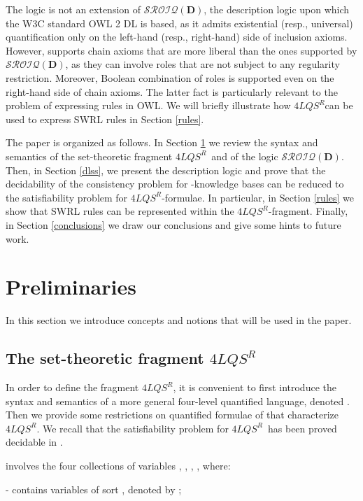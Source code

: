 \documentclass[a4paper]{llncs}
\newcommand{\sroiqd}{\ensuremath{\mathcal{SROIQ}(\D)}}
\newcommand{\flqsr}{\ensuremath{4LQS^R}}
\newcommand{\D}{\mathbf{D}}
\begin{document}
The logic  is not an extension of \sroiqd, the description logic upon which the W3C standard OWL 2 DL is based, as it admits existential (resp., universal) quantification only on the left-hand (resp., right-hand) side of inclusion axioms. However,  supports chain axioms that are more liberal than the ones supported by \sroiqd, as they can involve roles that are not subject to any regularity restriction. Moreover, Boolean combination of roles is supported even on the right-hand side of chain axioms. The latter fact is particularly relevant to the problem of expressing rules in OWL. We will
briefly illustrate how \flqsr\space can be used to express SWRL rules in Section \ref{rules}.








The paper is organized as follows. In Section \ref{prelim} we review the syntax and semantics of the set-theoretic fragment \flqsr\ and of the logic \sroiqd. Then, in Section \ref{dlss}, we present the description logic  and prove that the decidability of the consistency problem for -knowledge bases can be reduced to the satisfiability problem for \flqsr-formulae. In particular, in Section \ref{rules} we show that SWRL rules can be represented within the \flqsr-fragment. Finally, in Section \ref{conclusions} we draw our conclusions and give some hints to future work.






\section{Preliminaries}\label{prelim}
In this section we introduce concepts and notions that will be used in the paper.

\subsection{The set-theoretic fragment \flqsr} \label{4LQS}
In order to define the fragment \flqsr, it is convenient to first introduce the syntax and semantics of a more general four-level quantified language, denoted .
Then we provide some restrictions on quantified formulae of  that characterize \flqsr.
We recall that the satisfiability problem for \flqsr\ has been proved decidable in \cite{CanNic2013}.

 involves the four collections of variables , , , , where:

\smallskip
{-   contains variables of sort , denoted by ; }
\end{document}
